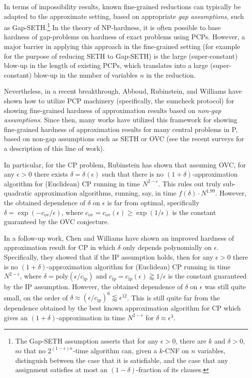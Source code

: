 \documentclass[11pt]{article}
\theoremstyle{plain}
\theoremstyle{remark}
\newcommand{\iP}{\mathrm{ip}}
\newcommand{\ov}{\mathrm{ov}}
\newcommand{\poly}{\mathrm{poly}}
\begin{document}
In terms of impossibility results, known fine-grained reductions can typically be adapted to the approximate setting, based on appropriate 
\emph{gap assumptions},  such as Gap-SETH.\footnote{ The Gap-SETH assumption asserts that for any $\epsilon>0$, there are $k$ and $\delta >0$,  so that no $2^{(1-\epsilon)n}$-time algorithm can, given a $k$-CNF on $n$ variables, distinguish between the case that it is satisfiable, and the case that any assignment satisfies at most an $(1-\delta)$-fraction of its clauses.} 
 In the theory of NP-hardness, it is often possible to base hardness of gap-problems on hardness of exact  problems using PCPs. However, a major barrier  in applying this approach in the fine-grained setting (for example for the purpose of reducing  SETH to Gap-SETH) is the large (super-constant) blow-up in the length of existing PCPs, which translates into a large (super-constant) blow-up in the number of variables $n$ in the reduction. 

Nevertheless, in a recent breakthrough, Abboud, Rubinstein, and Williams \cite{ARW17}   have shown how to utilize PCP machinery (specifically, the sumcheck protocol) for showing fine-grained hardness of approximation results based on \emph{non-gap assumptions}. Since then,  
many works have utilized this framework for showing fine-grained hardness of approximation results for many central problems in P, based on non-gap assumptions such as SETH or OVC 
(see the recent surveys \cite{RW19, FSLM20} for a description of this line of work). 

In particular, for the CP problem, Rubinstein \cite{Rub18} has shown that assuming OVC, for any $\epsilon >0$ there exists $\delta = \delta(\epsilon)$ such that there is no 
$(1+\delta)$-approximation algorithm for (Euclidean)  CP running in time $N^{2-\epsilon}$. This rules out truly sub-quadratic approximation algorithms, running, say, in time $f(\delta) \cdot N^{1.99}$.  However, the obtained dependence of $\delta$ on $\epsilon$ is far from optimal, specifically
$\delta =\exp(- c_{\ov}/\epsilon)$, where $c_{\ov}=c_{\ov}(\epsilon) \geq \exp(1/\epsilon)$ is the constant guaranteed by the OVC conjecture.

In a follow-up work, Chen and Williams \cite{CW19} have shown an improved hardness of approximation result for CP in which $\delta$ only depends polynomially on $\epsilon$. Specifically, they showed that if the IP assumption holds, then for any $\epsilon>0$ there is no 
$(1+\delta)$-approximation algorithm for (Euclidean) CP running in time $N^{2-\epsilon}$, where $\delta = \poly(\epsilon/c_{\iP})$ and $c_{\iP} = c_{\iP}(\epsilon) \gtrapprox 1/\epsilon$  is the constant guaranteed by the IP assumption.
However, the obtained dependence of $\delta$ on $\epsilon$ was still quite small, on the order of $\delta \approx (\epsilon/c_{\iP})^6 \lessapprox \epsilon^{12}$. This is still quite far from the dependence obtained by the best known approximation algorithm for CP which gives an $(1+\delta)$-approximation in time $N^{2-\epsilon}$ for $\delta \approx \epsilon^3$.
\end{document}
